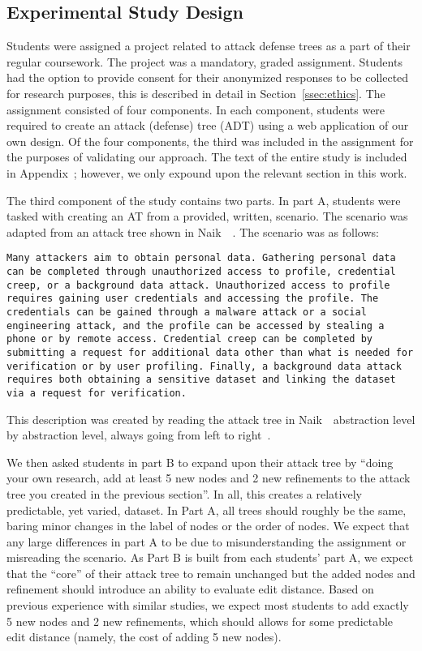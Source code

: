 \subsection{Experimental Study Design}
\label{ssec:method-study-design}

Students were assigned a project related to attack defense trees as a part of their regular coursework. The project was a mandatory, graded assignment. Students had the option to provide consent for their anonymized responses to be collected for research purposes, this is described in detail in Section~\ref{ssec:ethics}. The assignment consisted of four components. In each component, students were required to create an attack (defense) tree (ADT) using a web application of our own design. Of the four components, the third was included in the assignment for the purposes of validating our approach. The text of the entire study is included in Appendix~; however, we only expound upon the relevant section in this work.

The third component of the study contains two parts. In part A, students were tasked with creating an AT from a provided, written, scenario. The scenario was adapted from an attack tree shown in Naik~\etal~\cite{naikEvaluationPotentialAttack2022}. The scenario was as follows:

\texttt{Many attackers aim to obtain personal data. Gathering personal data can be completed through unauthorized access to profile, credential creep, or a background data attack. Unauthorized access to profile requires gaining user credentials and accessing the profile. The credentials can be gained through a malware attack or a social engineering attack, and the profile can be accessed by stealing a phone or by remote access. Credential creep can be completed by submitting a request for additional data other than what is needed for verification or by user profiling. Finally, a background data attack requires both obtaining a sensitive dataset and linking the dataset via a request for verification.}

This description was created by reading the attack tree in Naik~\etal\ abstraction level by abstraction level, always going from left to right~\cite{naikEvaluationPotentialAttack2022}. 

We then asked students in part B to expand upon their attack tree by ``doing your own research, add at least 5 new nodes and 2 new refinements to the attack tree you created in the previous section''. In all, this creates a relatively predictable, yet varied, dataset. In Part A, all trees should roughly be the same, baring minor changes in the label of nodes or the order of nodes. We expect that any large differences in part A to be due to misunderstanding the assignment or misreading the scenario. As Part B is built from each students' part A, we expect that the ``core'' of their attack tree to remain unchanged but the added nodes and refinement should introduce an ability to evaluate edit distance. Based on previous experience with similar studies, we expect most students to add exactly 5 new nodes and 2 new refinements, which should allows for some predictable edit distance (namely, the cost of adding 5 new nodes).


